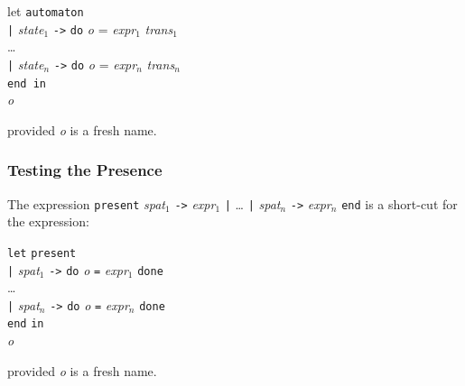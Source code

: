 \documentclass[11pt,titlepage,twoside]{report}
\newcommand{\In}{\mbox{{\tt in}}}
\newcommand{\Minusgreater}{\mbox{{\tt ->}}}
\newcommand{\term}[1]{{\tt #1}}
\newcommand{\nterm}[1]{{\em #1}}
\begin{document}
\begin{tabbing}
let \= \term{automaton} \\
    \> \term{|} \nterm{state}$_1$ \term{\Minusgreater} 
                 \term{do} \nterm{o} = \nterm{expr}$_1$ \nterm{trans}$_1$ \\
    \> \dots \\
    \> \term{|} \nterm{state}$_n$ \term{\Minusgreater} 
              \term{do} \nterm{o} = \nterm{expr}$_n$ \nterm{trans}$_n$ \\
    \> \term{end in} \\
\nterm{o}
\end{tabbing}
provided \nterm{o} is a fresh name.

\subsubsection{Testing the Presence}
The expression
\term{present}
  \nterm{spat}$_1$ \term{\Minusgreater} \nterm{expr}$_1$ \term{|} \dots 
\term{|} \nterm{spat}$_n$ \term{\Minusgreater} \nterm{expr}$_n$ \term{end}
is a short-cut for the expression:

\begin{center}
\begin{tabbing}
\term{let} \= \term{present} \\
           \> \term{|} \nterm{spat}$_1$ \term{\Minusgreater} 
               \term{do} \nterm{o} \term{=} \nterm{expr}$_1$ \term{done} \\
           \> \dots \\
           \> \term{|} \nterm{spat}$_n$ \term{\Minusgreater} 
               \term{do} \nterm{o} \term{=} \nterm{expr}$_n$ \term{done} \\
           \> \term{end} \In \\
\nterm{o}
\end{tabbing}
\end{center}
provided \nterm{o} is a fresh name.
\end{document}
